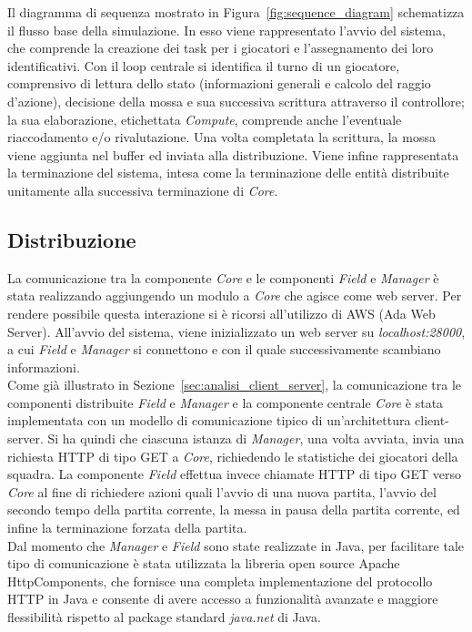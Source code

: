 Il diagramma di sequenza mostrato in Figura~\ref{fig:sequence_diagram} schematizza il flusso base della simulazione. In esso viene rappresentato l'avvio del sistema, che comprende la creazione dei task per i giocatori e l'assegnamento dei loro identificativi. Con il loop centrale si identifica il turno di un giocatore, comprensivo di lettura dello stato (informazioni generali e calcolo del raggio d'azione), decisione della mossa e sua successiva scrittura attraverso il controllore; la sua elaborazione, etichettata \emph{Compute}, comprende anche l'eventuale riaccodamento e/o rivalutazione. Una volta completata la scrittura, la mossa viene aggiunta nel buffer ed inviata alla distribuzione. Viene infine rappresentata la terminazione del sistema, intesa come la terminazione delle entità distribuite unitamente alla successiva terminazione di \emph{Core}.\\

\subsection{Distribuzione}
\label{sec:implementazione_distribuzione}

La comunicazione tra la componente \emph{Core} e le componenti \emph{Field} e \emph{Manager} è stata realizzando aggiungendo un modulo a \emph{Core} che agisce come web server. Per rendere possibile questa interazione si è ricorsi all'utilizzo di AWS (Ada Web Server). All'avvio del sistema, viene inizializzato un web server su \emph{localhost:28000}, a cui \emph{Field} e \emph{Manager} si connettono e con il quale successivamente scambiano informazioni.\\

Come già illustrato in Sezione~\ref{sec:analisi_client_server}, la comunicazione tra le componenti distribuite \emph{Field} e \emph{Manager} e la componente centrale \emph{Core} è stata implementata con un modello di comunicazione tipico di un’architettura client-server. Si ha quindi che ciascuna istanza di \emph{Manager}, una volta avviata, invia una richiesta HTTP di tipo GET a \emph{Core}, richiedendo le statistiche dei giocatori della squadra. La componente \emph{Field} effettua invece chiamate HTTP di tipo GET verso \emph{Core} al fine di richiedere azioni quali l'avvio di una nuova partita, l'avvio del secondo tempo della partita corrente, la messa in pausa della partita corrente, ed infine la terminazione forzata della partita.\\

Dal momento che \textit{Manager} e \textit{Field} sono state realizzate in Java, per facilitare tale tipo di comunicazione è stata utilizzata la libreria open source Apache HttpComponents, che fornisce una completa implementazione del protocollo HTTP in Java e consente di avere accesso a funzionalità avanzate e maggiore flessibilità rispetto al package standard \emph{java.net} di Java.\\

